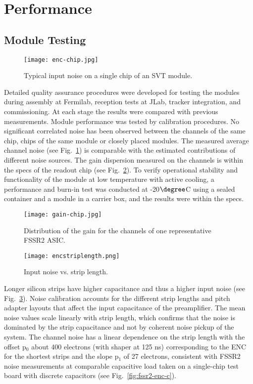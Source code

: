 \section{Performance}

\subsection{Module Testing}

\begin{figure}[hbt] 
\centering 
\texttt{[image: enc-chip.jpg]}
\caption{Typical input noise on a single chip of an SVT module.}
\label{fig:enc-chip}
\end{figure} 

Detailed quality assurance procedures were developed for testing the modules during assembly at Fermilab, reception tests at JLab, tracker integration, and commissioning. At each stage the results were compared with previous measurements. Module performance was tested by calibration procedures. No significant correlated noise has been observed between the channels of the same chip, chips of the same module or closely placed modules. The measured average channel noise (see Fig.~\ref{fig:enc-chip}) is comparable with the estimated contributions of different noise sources. The gain dispersion measured on the channels is within the specs of the readout chip (see Fig.~\ref{fig:gain-chip}). To verify operational stability and functionality of the module at low temperature with active cooling, a performance and burn-in test was conducted at -20$\degree$C using a sealed container and a module in a carrier box, and the results were within the specs.

\begin{figure}[hbt] 
\centering 
\texttt{[image: gain-chip.jpg]}
\caption{Distribution of the gain for the channels of one representative FSSR2 ASIC.}
\label{fig:gain-chip}
\end{figure}

\begin{figure}[hbt] 
	\centering 
	\texttt{[image: encstriplength.png]}
	\caption{Input noise vs. strip length.}
	\label{fig:encstriplength}
\end{figure}

Longer silicon strips have higher capacitance and thus a higher input noise (see Fig.~\ref{fig:encstriplength}). Noise calibration accounts for the different strip lengths and pitch adapter layouts that affect the input capacitance of the preamplifier. The mean noise values scale linearly with strip length, which confirms that the noise is dominated by the strip capacitance and not by coherent noise pickup of the system. The channel noise has a linear dependence on the strip length with the offset p$_{0}$ about 400 electrons (with shaper at 125 ns) corresponding to the ENC for the shortest strips and the slope p$_1$ of 27 electrons, consistent with FSSR2 noise measurements at comparable capacitive load taken on a single-chip test board with discrete capacitors (see Fig.~\ref{fig:fssr2-enc-c}).

